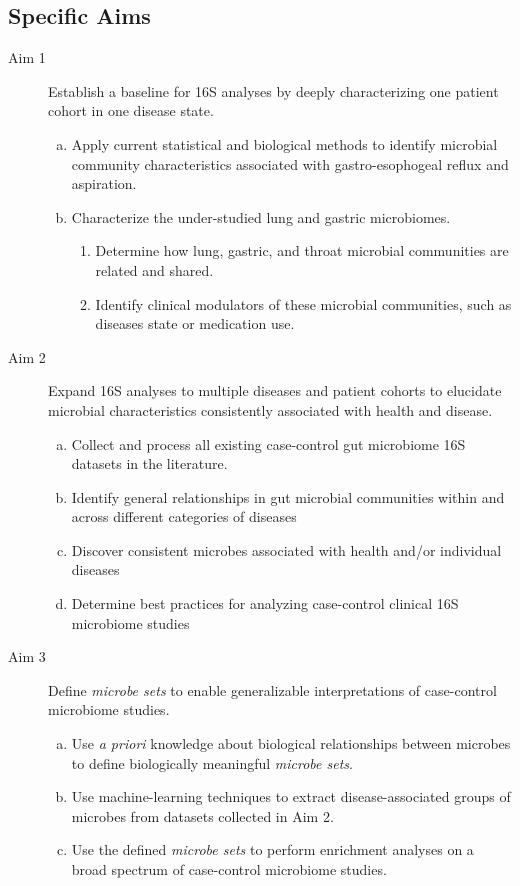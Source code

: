 \documentclass[12pt]{report}
\begin{document}
\subsection*{Specific Aims}
\begin{description}
	\item[Aim 1] Establish a baseline for 16S analyses by deeply characterizing one patient cohort in one disease state.
		\begin{enumerate}[(a)]
			\item  Apply current statistical and biological methods to identify microbial community characteristics associated with gastro-esophogeal reflux and aspiration.
			\item Characterize the under-studied lung and gastric microbiomes.
			\begin{enumerate}
			\item Determine how lung, gastric, and throat microbial communities are related and shared.
			\item Identify clinical modulators of these microbial communities, such as diseases state or medication use.
			\end{enumerate}
		\end{enumerate}
	\item[Aim 2] Expand 16S analyses to multiple diseases and patient cohorts to elucidate microbial characteristics consistently associated with health and disease.
	\begin{enumerate}[(a)]
		\item Collect and process all existing case-control gut microbiome 16S datasets in the literature.
		\item Identify general relationships in gut microbial communities within and across different categories of diseases
		\item Discover consistent microbes associated with health and/or individual diseases
		\item Determine best practices for analyzing case-control clinical 16S microbiome studies
	\end{enumerate}
	\item[Aim 3] Define \textit{microbe sets} to enable generalizable interpretations of case-control microbiome studies.
	\begin{enumerate}[(a)]
	\item Use \textit{a priori} knowledge about biological relationships between microbes to define biologically meaningful \textit{microbe sets}.
	\item Use machine-learning techniques to extract disease-associated groups of microbes from datasets collected in Aim 2.
	\item Use the defined \textit{microbe sets} to perform enrichment analyses on a broad spectrum of case-control microbiome studies.
	\end{enumerate}
\end{description}
\end{document}
